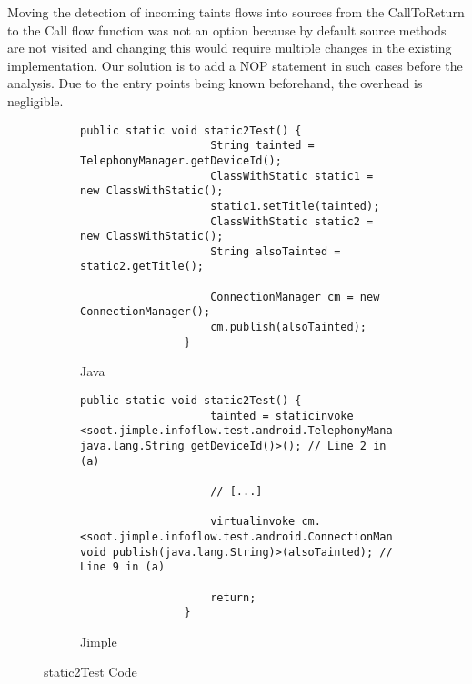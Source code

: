 \documentclass[../draft.tex]{subfiles}
\begin{document}
    Moving the detection of incoming taints flows into sources from the CallToReturn to the Call flow function was not an option because by default source methods are not visited and changing this would require multiple changes in the existing implementation.
    Our solution is to add a NOP statement in such cases before the analysis.
    Due to the entry points being known beforehand, the overhead is negligible.

    \begin{figure}[tbp]
        \centering
        \begin{subfigure}[b]{\textwidth}
            \begin{lstlisting}[gobble=16]
                public static void static2Test() {
                    String tainted = TelephonyManager.getDeviceId();
                    ClassWithStatic static1 = new ClassWithStatic();
                    static1.setTitle(tainted);
                    ClassWithStatic static2 = new ClassWithStatic();
                    String alsoTainted = static2.getTitle();

                    ConnectionManager cm = new ConnectionManager();
                    cm.publish(alsoTainted);
                }
            \end{lstlisting}
            \caption{Java}
        \end{subfigure}
        \qquad
        \begin{subfigure}[b]{\textwidth}
            \begin{lstlisting}[language=Jimple, gobble=16]
                public static void static2Test() {
                    tainted = staticinvoke <soot.jimple.infoflow.test.android.TelephonyManager: java.lang.String getDeviceId()>(); // Line 2 in (a)

                    // [...]

                    virtualinvoke cm.<soot.jimple.infoflow.test.android.ConnectionManager: void publish(java.lang.String)>(alsoTainted); // Line 9 in (a)

                    return;
                }
            \end{lstlisting}
            \caption{Jimple}
        \end{subfigure}
        \caption{static2Test Code}
        \label{lst:static2TestJava}
    \end{figure}
\end{document}
